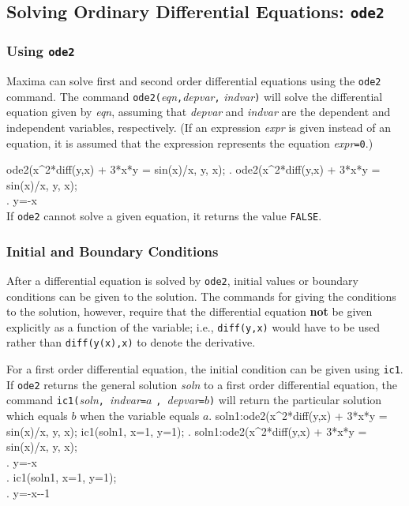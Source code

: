 \documentclass{article}
\begin{document}
\subsection{Solving Ordinary Differential Equations: \texttt{ode2}}
\label{subsec:ode2}

\subsubsection{Using \texttt{ode2}}

Maxima can solve first and second order differential equations using
the \texttt{ode2} command.  The command
\texttt{ode2(}\textit{eqn}\texttt{,}\textit{depvar}\texttt{,}%
\textit{indvar}\texttt{)}  will solve the differential equation
given by \textit{eqn}, assuming that \textit{depvar} and
\textit{indvar} are the dependent and independent variables,
respectively.  (If an expression \textit{expr} is given instead of an
equation, it is assumed that the expression represents the equation
\textit{expr}\texttt{=0}.)

\beginmaximasession
ode2(x^2*diff(y,x) + 3*x*y = sin(x)/x, y, x);
\maximatexsession
{}.  ode2(x^2*diff(y,x) + 3*x*y = sin(x)/x, y, x); \\
.   y={{-\cos x}} \\
\endmaximasession
\noindent
If \texttt{ode2} cannot solve a given equation, it returns
the value \texttt{FALSE}.

\subsubsection{Initial and Boundary Conditions}

After a differential equation is solved by \texttt{ode2}, initial
values or boundary conditions can be given to the solution.  The
commands for giving the conditions to the solution, however, require
that the differential equation \textbf{not} be given explicitly as a
function of the variable; i.e., \texttt{diff(y,x)} would have to be used
rather than \texttt{diff(y(x),x)} to denote the derivative.

For a first order differential equation, the initial condition can be
given using \texttt{ic1}. If \texttt{ode2} returns the general
solution \textit{soln} to a first order differential equation, the
command
\texttt{ic1(}\textit{soln}\texttt{, }\textit{indvar}\texttt{=}$a$%
\texttt{, }\textit{depvar}\texttt{=}$b$\texttt{)} will return the
particular solution which equals $b$ when the variable equals $a$.
\beginmaximasession
soln1:ode2(x^2*diff(y,x) + 3*x*y = sin(x)/x, y, x);
ic1(soln1, x=1, y=1);
\maximatexsession
{}.  soln1:ode2(x^2*diff(y,x) + 3*x*y = sin(x)/x, y, x); \\
.   y={{-\cos x}} \\
.  ic1(soln1, x=1, y=1); \\
.   y=-{{\cos x--1}} \\
\endmaximasession
\end{document}
